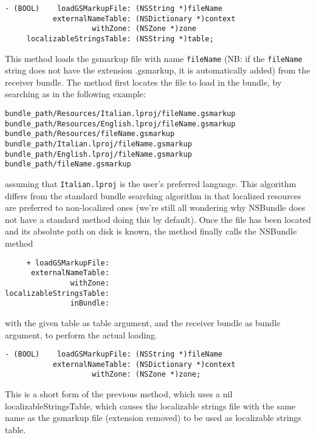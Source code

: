 \begin{verbatim}
- (BOOL)    loadGSMarkupFile: (NSString *)fileName
           externalNameTable: (NSDictionary *)context
                    withZone: (NSZone *)zone
     localizableStringsTable: (NSString *)table;
\end{verbatim}
This method loads the gsmarkup file with name \texttt{fileName} (NB: if
the \texttt{fileName} string does not have the extension .gsmarkup, it is
automatically added) from the receiver bundle.  The method first
locates the file to load in the bundle, by searching as in the
following example:
\begin{verbatim}
bundle_path/Resources/Italian.lproj/fileName.gsmarkup
bundle_path/Resources/English.lproj/fileName.gsmarkup
bundle_path/Resources/fileName.gsmarkup
bundle_path/Italian.lproj/fileName.gsmarkup
bundle_path/English.lproj/fileName.gsmarkup
bundle_path/fileName.gsmarkup
\end{verbatim}
assuming that \texttt{Italian.lproj} is the user's preferred language.
This algorithm differs from the standard bundle searching algorithm in
that localized resources are preferred to non-localized ones (we're
still all wondering why NSBundle does not have a standard method doing
this by default).  Once the file has been located and its absolute
path on disk is known, the method finally calls the NSBundle method
\begin{verbatim}
     + loadGSMarkupFile:
      externalNameTable:
               withZone:
localizableStringsTable:
               inBundle:
\end{verbatim}
with the given table as table argument, and the receiver bundle as
bundle argument, to perform the actual loading.

\begin{verbatim}
- (BOOL)    loadGSMarkupFile: (NSString *)fileName
           externalNameTable: (NSDictionary *)context
                    withZone: (NSZone *)zone;
\end{verbatim}
This is a short form of the previous method, which uses a nil
localizableStringsTable, which causes the localizable strings file
with the same name as the gsmarkup file (extension removed) to be used as
localizable strings table.

